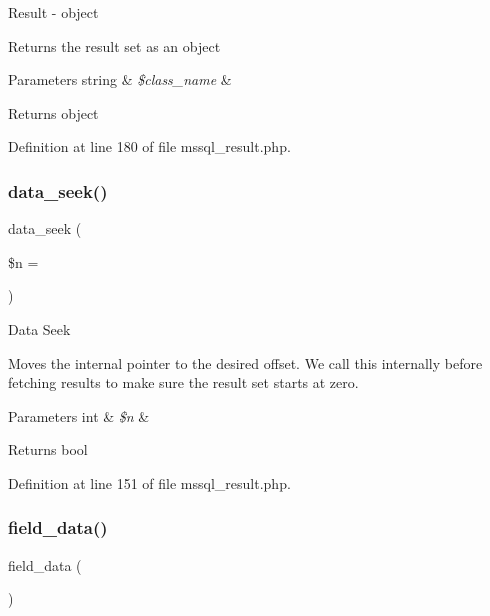 Result -\/ object

Returns the result set as an object


\begin{DoxyParams}[1]{Parameters}
string & {\em \$class\+\_\+name} & \\
\hline
\end{DoxyParams}
\begin{DoxyReturn}{Returns}
object 
\end{DoxyReturn}


Definition at line 180 of file mssql\+\_\+result.\+php.

\mbox{\label{class_c_i___d_b__mssql__result_a8255ae91816e4206e29eb7581c5af0f1}} 
\subsubsection{\texorpdfstring{data\_seek()}{data\_seek()}}
{\footnotesize\ttfamily data\+\_\+seek (\begin{DoxyParamCaption}\item[{}]{\$n = {} }\end{DoxyParamCaption})}

Data Seek

Moves the internal pointer to the desired offset. We call this internally before fetching results to make sure the result set starts at zero.


\begin{DoxyParams}[1]{Parameters}
int & {\em \$n} & \\
\hline
\end{DoxyParams}
\begin{DoxyReturn}{Returns}
bool 
\end{DoxyReturn}


Definition at line 151 of file mssql\+\_\+result.\+php.

\mbox{\label{class_c_i___d_b__mssql__result_a84bffd65e53902ade1591716749a33e3}} 
\subsubsection{\texorpdfstring{field\_data()}{field\_data()}}
{\footnotesize\ttfamily field\+\_\+data (\begin{DoxyParamCaption}{ }\end{DoxyParamCaption})}

